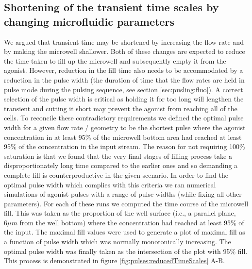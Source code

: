 \subsection{Shortening of the transient time scales by changing microfluidic parameters}
\label{sec:pulses:fastPulses}
We argued that transient time may be shortened by increasing the flow rate and by making the microwell shallower. Both of these changes are expected to reduce the time taken to fill up the microwell and subsequently empty it from the agonist. However, reduction in the fill time also needs to be accommodated by a reduction in the pulse width (the duration of time that the flow rates are held in pulse mode during the pulsing sequence, see section \ref{sec:pusling:fluo}). A correct selection of the pulse width is critical as holding it for too long will lengthen the transient and cutting it short may prevent the agonist from reaching all of the cells. To reconcile these contradictory requirements we defined the optimal pulse width for a given flow rate / geometry to be the shortest pulse where the agonist concentration in at least 95\% of the microwell bottom area had reached at least 95\% of the concentration in the input stream. The reason for not requiring 100\% saturation is that we found that the very final stages of filling process take a disproportionately long time compared to the earlier ones and so demanding a complete fill is counterproductive in the given scenario. In order to find the optimal pulse width which complies with this criteria we ran numerical simulations of agonist pulses with a range of pulse widths (while fixing all other parameters). For each of these runs we computed the time course of the microwell fill. This was taken as the proportion of the well surface (i.e., a parallel plane, \(6\mu m\) from the well bottom) where the concentration had reached at least 95\% of the input. The maximal fill values were used to generate a plot of maximal fill as a function of pulse width which was normally monotonically increasing. The optimal pulse width was finally taken as the intersection of the plot with 95\% fill. This process is demonstrated in figure \ref{fig:pulses:reducedTimeScales} A-B.

